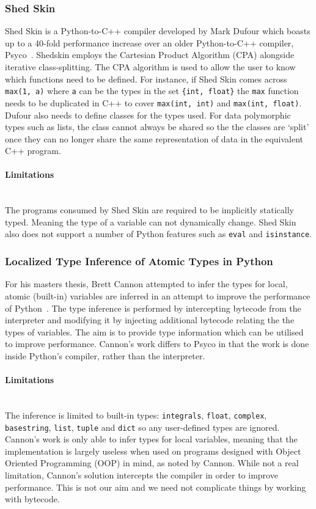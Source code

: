 \documentclass[12pt, titlepage]{article}
\begin{document}
\subsubsection{Shed Skin}
Shed Skin is a Python-to-C++ compiler developed by Mark Dufour which boasts up to a 40-fold performance increase over an older Python-to-C++ compiler, Psyco~\cite{shedskin}. Shedskin employs the Cartesian Product Algorithm (CPA) alongside iterative class-splitting. The CPA algorithm is used to allow the user to know which functions need to be defined. For instance, if Shed Skin comes across \texttt{max(1, a)} where \texttt{a} can be the types in the set \texttt{\{int, float\}} the \texttt{max} function needs to be duplicated in C++ to cover \texttt{max(int, int)} and \texttt{max(int, float)}. Dufour also needs to define classes for the types used. For data polymorphic types such as lists, the class cannot always be shared so the the classes are `split' once they can no longer share the same representation of data in the equivalent C++ program.

\paragraph*{Limitations}\mbox{}\\
The programs consumed by Shed Skin are required to be implicitly statically typed. Meaning the type of a variable can not dynamically change. Shed Skin also does not support a number of Python features such as \texttt{eval} and \texttt{isinstance}.

\subsubsection{Localized Type Inference of Atomic Types in Python}
For his masters thesis, Brett Cannon attempted to infer the types for local, atomic (built-in) variables are inferred in an attempt to improve the performance of Python~\cite{cannonlocalizedtype}. The type inference is performed by intercepting bytecode from the interpreter and modifying it by injecting additional bytecode relating the the types of variables. The aim is to provide type information which can be utilised to improve performance. Cannon's work differs to Psyco in that the work is done inside Python's compiler, rather than the interpreter.
\paragraph{Limitations}\mbox{}\\
The inference is limited to built-in types: \texttt{integrals}, \texttt{float}, \texttt{complex}, \texttt{basestring}, \texttt{list}, \texttt{tuple} and \texttt{dict} so any user-defined types are ignored. \\
\indent Cannon's work is only able to infer types for local variables, meaning that the implementation is largely useless when used on programs designed with Object Oriented Programming (OOP) in mind, as noted by Cannon. While not a real limitation, Cannon's solution intercepts the compiler in order to improve performance. This is not our aim and we need not complicate things by working with bytecode.
\end{document}
